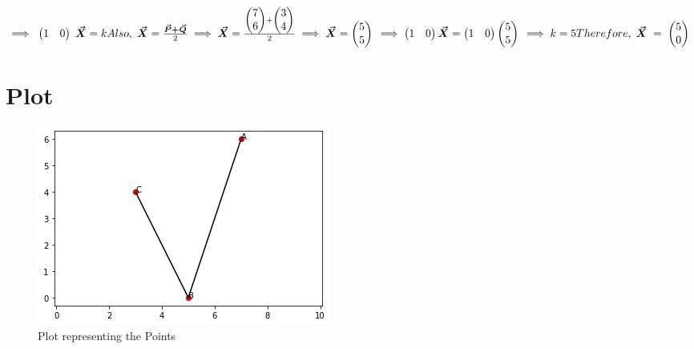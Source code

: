 \documentclass{article}
\newcommand{\myvec}[1]{\ensuremath{\begin{pmatrix}#1\end{pmatrix}}}
\begin{document}
\begin{math}
\implies \hspace{0.1cm} \myvec{1 & 0} \hspace{0.1cm} \bm{\vec{X}} = k \newline\newline\newline
Also, \hspace{0.1cm} \bm{\vec{X}} = \frac{\bm{\vec{P}+\vec{Q}}}{2} \newline\newline\newline
\implies \bm{\vec{X}} = \frac{\myvec{7\\6}+\myvec{3\\4}}{2} \newline\newline\newline
\implies \bm{\vec{X}} = \myvec{5\\5} \newline\newline\newline
\implies \myvec{1 & 0}\bm{\vec{X}} = \myvec{1 & 0}\myvec{5\\5} \newline\newline\newline
\implies k = 5 \newline\newline\newline
Therefore, \hspace{0.1cm} \bm{\vec{X}} \hspace{0.1cm} = \hspace{0.1cm} \myvec{5\\0}\newline\newline\newline
\end{math}
\section*{Plot}
\begin{figure}[!htb]
    \centering
    \includegraphics{Assignment1.png}
    \caption{Plot representing the Points}
    \label{Fig.1}
\end{figure}
\end{document}
